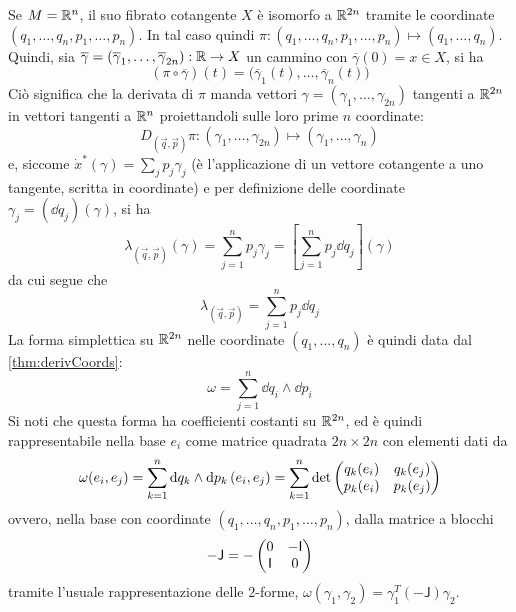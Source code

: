 Se $M = \mathbb{R}^{n}$, il suo fibrato cotangente $X$ è isomorfo a $\mathbb{R}^{2n}$ tramite le coordinate $(q_1, \ldots, q_n, p_1, \ldots, p_n)$. In tal caso quindi $\pi: (q_1, \ldots, q_n, p_1, \ldots, p_n) \mapsto  (q_1, \ldots, q_n)$. Quindi, sia $\overline{\gamma} = (\overline{\gamma}_1, \ldots, \overline{\gamma}_{2n}):\mathbb{R} \to X$ un cammino con $\overline{\gamma}(0) = x \in X$, si ha \begin{equation*}
(\pi \circ \overline{\gamma}) (t) = \big(\overline{\gamma}_1(t), \ldots, \overline{\gamma}_n (t)\big)
\end{equation*} 
Ciò significa che la derivata di $\pi$ manda vettori $\gamma = (\gamma_1, \ldots, \gamma_{2n})$ tangenti a $\mathbb{R}^{2n}$ in vettori tangenti a $\mathbb{R}^{n}$ proiettandoli sulle loro prime $n$ coordinate:
\begin{equation*}
  D_{(\vec{q},\vec{p})}\pi: (\gamma_1, \ldots, \gamma_{2n}) \mapsto  (\gamma_1, \ldots, \gamma_n)
\end{equation*}
e, siccome $\dot{x}^*(\gamma) = \sum_j p_j \gamma_j$ (è l'applicazione di un vettore cotangente a uno tangente, scritta in coordinate) e per definizione delle coordinate $\gamma_j = (\dd{q}_j)(\gamma)$, si ha \begin{equation*}
\lambda_{(\vec{q},\vec{p})} (\gamma) = \sum_{j=1}^n p_j \gamma_j = \left[\sum_{j=1}^n p_j \dd{q_j}\right] (\gamma)
\end{equation*} 
da cui segue che \begin{equation}
  \lambda_{(\vec{q},\vec{p})} = \sum_{j=1}^n p_j \dd{q_j}
\end{equation} 
La forma simplettica su $\mathbb{R}^{2n}$ nelle coordinate $(q_1, \ldots, q_n)$ è quindi data dal \autoref{thm:derivCoords}: 
\begin{equation} \label{eq:R2nSympForm}
\omega = \sum_{j=1}^n \dd{q_i} \wedge \dd{p_i}
\end{equation} 
Si noti che questa forma ha coefficienti costanti su $\mathbb{R}^{2n}$, ed è quindi rappresentabile nella base $e_i$ come matrice quadrata $2n \times 2n$ con elementi dati da 
\begin{equation*}
\omega(e_i, e_j) = \sum_{k=1}^{n} \dd{q_k} \wedge \dd{p_k}(e_i, e_j) = \sum_{k=1}^{n} \det\pmqty{q_k(e_i) & q_k(e_j) \\ p_k(e_i) & p_k(e_j)}
\end{equation*}
ovvero, nella base con coordinate $(q_1, \ldots, q_n, p_1, \ldots, p_n)$, dalla matrice a blocchi
\begin{equation*}
- \mathsf{J} = - \pmqty{0 & -\mathsf{I} \\ \mathsf{I} & 0}
\end{equation*} 
tramite l'usuale rappresentazione delle $2$-forme, $\omega(\gamma_1, \gamma_2) = \gamma_1^T (-\mathsf{J}) \gamma_2$.


